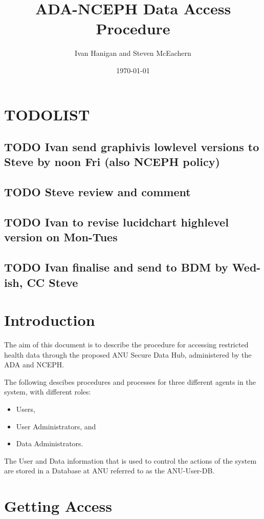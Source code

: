 \documentclass[a4paper]{article}
\title{ADA-NCEPH Data Access Procedure}
\author{Ivan Hanigan and Steven McEachern}
\date{\today}
\begin{document}
\maketitle

\tableofcontents

\clearpage
\section{TODOLIST}
\label{sec-1}
\subsection{\textbf{TODO} Ivan send graphivis lowlevel versions to Steve by noon Fri (also NCEPH policy)}
\label{sec-1-1}
\subsection{\textbf{TODO} Steve review and comment}
\label{sec-1-2}
\subsection{\textbf{TODO} Ivan to revise lucidchart highlevel version on Mon-Tues}
\label{sec-1-3}
\subsection{\textbf{TODO} Ivan finalise and send to BDM by Wed-ish, CC Steve}
\label{sec-1-4}
\section{Introduction}
\label{sec-2}

The aim of this document is to describe the procedure for accessing restricted health data through the proposed ANU Secure Data Hub, administered by the ADA and NCEPH.

The following descibes procedures and processes for three different agents in the system, with different roles:
\begin{itemize}
\item Users,
\item User Administrators, and
\item Data Administrators.
\end{itemize}

The User and Data information that is used to control the actions of the system are stored in a Database at ANU referred to as the ANU-User-DB.
\newpage
\section{Getting Access}
\label{sec-3}
\end{document}
